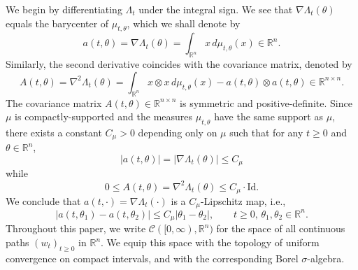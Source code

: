 \documentclass[12pt,a4paper]{article}
\newcommand{\RR}{\mathbb{R}}
\newcommand{\R}{\mathbb{R}}
\newcommand{\id}{\mathrm{Id}}
\theoremstyle{definition}
\begin{document}
%
%
\medskip We begin by differentiating $\Lambda_t$ under the integral sign.
We see that $\nabla \Lambda_t(\theta)$ equals the barycenter of $\mu_{t,\theta}$,
which we shall denote by 
\begin{equation}
a(t,\theta) = \nabla \Lambda_t(\theta) = \int_{\RR^n} x \, d \mu_{t, \theta} (x)  \in \RR^n .  \label{eq_1329}
\end{equation}
Similarly, the second derivative coincides with the covariance
matrix, denoted by 
\begin{equation}
	A(t, \theta) = \nabla^2 \Lambda_t(\theta) = \int_{\RR^n}
	x \otimes x \, d \mu_{t,\theta} (x) - a(t, \theta) \otimes a(t, \theta) \in \RR^{n \times n}.	\label{eq_1122}
\end{equation}
The covariance matrix $A(t, \theta) \in \RR^{n \times n}$ is symmetric and positive-definite. Since $\mu$ is compactly-supported and the measures $\mu_{t,\theta}$ have the same support
as $\mu$, there exists a constant $C_\mu > 0$ depending only on $\mu$ such that for any $t\geq 0$ and $\theta \in \R^n$,
\begin{equation}\label{eq_1123_}
  |a(t, \theta)| = |\nabla \Lambda_t(\theta)| \leq C_{\mu} \end{equation}
while
\begin{equation} 
0 \leq A(t,\theta) = \nabla^2 \Lambda_t (\theta) \leq C_\mu \cdot \id.
\label{eq_727} \end{equation}
We conclude that $a(t,\cdot)= \nabla \Lambda_t(\cdot)$ is a $C_{\mu}$-Lipschitz map, i.e., 
\begin{equation}\label{eq_1123}
\vert a(t,\theta_1) - a(t,\theta_2) \vert \leq C_\mu \vert \theta_1 -\theta_2\vert , \qquad  t \geq 0 , \, \theta_1,\theta_2\in \R^n.
\end{equation}
Throughout this paper, we write $\mathcal C ( [0,\infty) , \R^n )$
for the space of all continuous paths $(w_t)_{t \geq 0}$ in $\R^n$. 
We equip this space with the
topology of uniform convergence on compact intervals, and with the
corresponding Borel $\sigma$-algebra.
\end{document}
